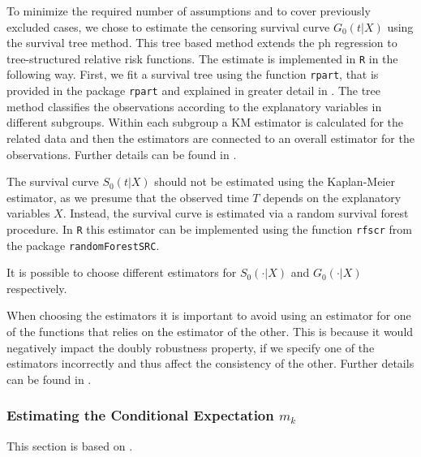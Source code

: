 \documentclass[12pt, a4paper]{article}
\theoremstyle{definition}
\theoremstyle{plain}
\numberwithin{equation}{section}
\numberwithin{figure}{section}
\numberwithin{table}{section}
\begin{document}
	To minimize the required number of assumptions and to cover previously excluded cases, we chose to estimate the censoring survival curve $G_0(t \vert X)$ using the survival tree method.
	This tree based method extends the ph regression to tree-structured relative risk functions.
	The estimate is implemented in \texttt{R} in the following way.
	First, we fit a survival tree using the function \texttt{rpart}, that is provided in the package \texttt{rpart} and explained in greater detail in \citet*{rpart}.
	The tree method classifies the observations according to the explanatory variables in different subgroups.
	Within each subgroup a KM estimator is calculated for the related data and then the estimators are connected to an overall estimator for the observations. %
	Further details can be found in \citet*{relativerisktrees}.
	
	The survival curve $S_0(t\vert X)$ should not be estimated using the Kaplan-Meier estimator, as we presume that the observed time $T$ depends on the explanatory variables $X$.
	Instead, the survival curve is estimated via a random survival forest procedure.
	In \texttt{R} this estimator can be implemented using the function \texttt{rfscr} from the package \texttt{randomForestSRC}. 
	
	It is possible to choose different estimators for $S_0(\cdot\vert X)$ and $G_0(\cdot\vert X)$ respectively.
	
	When choosing the estimators it is important to avoid using an estimator for one of the functions that relies on the estimator of the other.
	This is because it would negatively impact the doubly robustness property, if we specify one of the estimators incorrectly and thus affect the consistency of the other.
	Further details can be found in \citet*{drtrees}.
	
	\subsubsection{Estimating the Conditional Expectation $m_k$}
	
	This section is based on \citet*{drtrees}.
	
\end{document}
